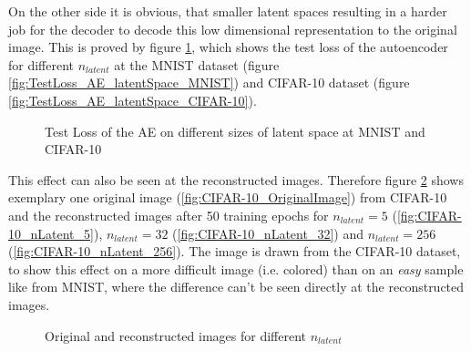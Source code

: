 \documentclass[12pt,DIV14,BCOR12mm,a4paper,footexclude,headinclude,halfparskip-,twoside,openright,cleardoubleempty,idxtotoc,bibtotoc,listtotoc,abstracton]{scrreprt} %
\numberwithin{equation}{chapter}
\begin{document}
On the other side it is obvious, that smaller latent spaces resulting in a harder job for the decoder to decode this low dimensional representation to the original image. This is proved by figure \ref{fig:TestLoss_AE_latentSpace}, which shows the test loss of the autoencoder for different $n_{latent}$ at the MNIST dataset (figure \ref{fig:TestLoss_AE_latentSpace_MNIST}) and CIFAR-10 dataset (figure \ref{fig:TestLoss_AE_latentSpace_CIFAR-10}).
	\begin{figure}[htb!]
		\centering
		\qquad
		\caption{Test Loss of the AE on different sizes of latent space at MNIST and CIFAR-10}
		\label{fig:TestLoss_AE_latentSpace}
	\end{figure}
This effect can also be seen at the reconstructed images. Therefore figure \ref{fig:Reconstructions_nLatent} shows exemplary one original image (\ref{fig:CIFAR-10_OriginalImage}) from CIFAR-10 and the reconstructed images after 50 training epochs for $n_{latent}=5$ (\ref{fig:CIFAR-10_nLatent_5}), $n_{latent}=32$ (\ref{fig:CIFAR-10_nLatent_32}) and $n_{latent}=256$ (\ref{fig:CIFAR-10_nLatent_256}). The image is drawn from the CIFAR-10 dataset, to show this effect on a more difficult image (i.e. colored) than on an \textit{easy} sample like from MNIST, where the difference can't be seen directly at the reconstructed images.
\begin{figure}[htb!]
	\centering
	\qquad
	\qquad
	\qquad
	\qquad
	\caption{Original and reconstructed images for different $n_{latent}$}
	\label{fig:Reconstructions_nLatent}
\end{figure}
\end{document}
